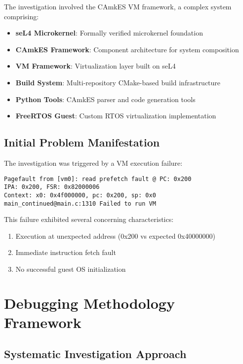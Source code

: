 \documentclass[11pt,a4paper]{article}
\begin{document}
The investigation involved the CAmkES VM framework, a complex system comprising:

\begin{itemize}
\item \textbf{seL4 Microkernel}: Formally verified microkernel foundation
\item \textbf{CAmkES Framework}: Component architecture for system composition
\item \textbf{VM Framework}: Virtualization layer built on seL4
\item \textbf{Build System}: Multi-repository CMake-based build infrastructure
\item \textbf{Python Tools}: CAmkES parser and code generation tools
\item \textbf{FreeRTOS Guest}: Custom RTOS virtualization implementation
\end{itemize}

\subsection{Initial Problem Manifestation}

The investigation was triggered by a VM execution failure:

\begin{lstlisting}[caption=Initial Failure Symptoms]
Pagefault from [vm0]: read prefetch fault @ PC: 0x200 
IPA: 0x200, FSR: 0x82000006
Context: x0: 0x4f000000, pc: 0x200, sp: 0x0
main_continued@main.c:1310 Failed to run VM
\end{lstlisting}

This failure exhibited several concerning characteristics:
\begin{enumerate}
\item Execution at unexpected address (0x200 vs expected 0x40000000)
\item Immediate instruction fetch fault
\item No successful guest OS initialization
\end{enumerate}

\section{Debugging Methodology Framework}

\subsection{Systematic Investigation Approach}
\end{document}
